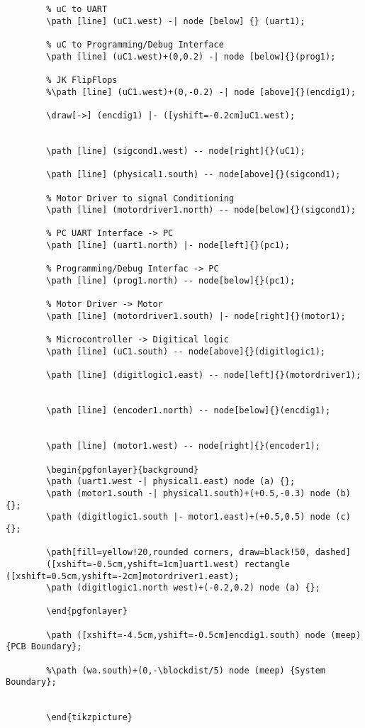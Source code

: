 \begin{verbatim}
		% uC to UART
		\path [line] (uC1.west) -| node [below] {} (uart1);
		
		% uC to Programming/Debug Interface
		\path [line] (uC1.west)+(0,0.2) -| node [below]{}(prog1); 
		
		% JK FlipFlops
		%\path [line] (uC1.west)+(0,-0.2) -| node [above]{}(encdig1); 
		
		\draw[->] (encdig1) |- ([yshift=-0.2cm]uC1.west);
		
		
		\path [line] (sigcond1.west) -- node[right]{}(uC1);
		
		\path [line] (physical1.south) -- node[above]{}(sigcond1);
		
		% Motor Driver to signal Conditioning
		\path [line] (motordriver1.north) -- node[below]{}(sigcond1);
		
		% PC UART Interface -> PC
		\path [line] (uart1.north) |- node[left]{}(pc1);
		
		% Programming/Debug Interfac -> PC
		\path [line] (prog1.north) -- node[below]{}(pc1);
		
		% Motor Driver -> Motor
		\path [line] (motordriver1.south) |- node[right]{}(motor1); 
		
		% Microcontroller -> Digitical logic
		\path [line] (uC1.south) -- node[above]{}(digitlogic1);
		
		\path [line] (digitlogic1.east) -- node[left]{}(motordriver1);
		
		
		\path [line] (encoder1.north) -- node[below]{}(encdig1);
		
		
		\path [line] (motor1.west) -- node[right]{}(encoder1);
		
		\begin{pgfonlayer}{background}
		\path (uart1.west -| physical1.east) node (a) {};
		\path (motor1.south -| physical1.south)+(+0.5,-0.3) node (b) {};
		\path (digitlogic1.south |- motor1.east)+(+0.5,0.5) node (c) {};
		
		\path[fill=yellow!20,rounded corners, draw=black!50, dashed]
		([xshift=-0.5cm,yshift=1cm]uart1.west) rectangle ([xshift=0.5cm,yshift=-2cm]motordriver1.east);           
		\path (digitlogic1.north west)+(-0.2,0.2) node (a) {};
		
		\end{pgfonlayer}
		
		\path ([xshift=-4.5cm,yshift=-0.5cm]encdig1.south) node (meep) {PCB Boundary};
		
		%\path (wa.south)+(0,-\blockdist/5) node (meep) {System Boundary};
		
		
		\end{tikzpicture}
\end{verbatim}

